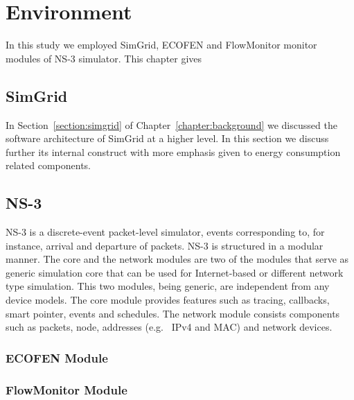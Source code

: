 \chapter{Environment}
\label{chapter:environment}
In this study we employed SimGrid, ECOFEN and FlowMonitor monitor modules of NS-3 simulator. This chapter gives 
\section{SimGrid}
In Section~\ref{section:simgrid} of Chapter~\ref{chapter:background} we discussed the software architecture of SimGrid at a higher level. In this section we discuss further its internal construct with more emphasis given to energy consumption related components.
\section{NS-3}
NS-3 is a discrete-event packet-level simulator, events corresponding to, for instance, arrival and departure of packets. NS-3 is structured in a modular manner. The core and the network modules are two of the modules that serve as generic simulation core that can be used for Internet-based or different network type simulation. This two modules, being generic, are independent from any device models. The core module provides features such as tracing, callbacks, smart pointer, events and schedules. The network module consists components such as packets, node, addresses (e.g.{\ } IPv4 and MAC) and network devices. 


\subsection{ECOFEN Module}
\subsection{FlowMonitor Module}